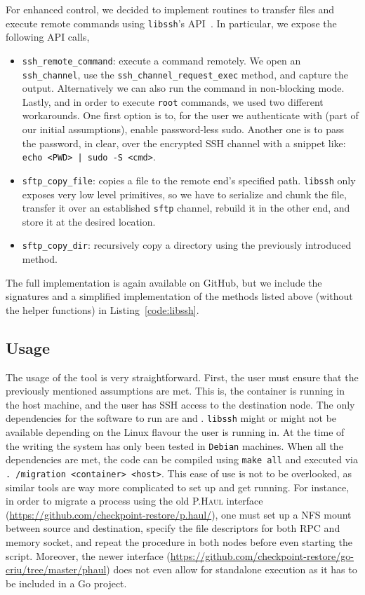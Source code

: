 For enhanced control, we decided to implement routines to transfer files and
execute remote commands using \texttt{libssh}'s API~\cite{libssh,libssh-api}.
In particular, we expose the following API calls,
\begin{itemize}
    \item
          \texttt{ssh\_remote\_command}: execute a command remotely.
          We open an \texttt{ssh\_channel}, use the \texttt{ssh\_channel\_request\_exec}
          method, and capture the output.
          Alternatively we can also run the command in non-blocking mode.
          Lastly, and in order to execute \texttt{root} commands, we used two different
          workarounds.
          One first option is to, for the user we authenticate with (part of our initial
          assumptions), enable password-less sudo.
          Another one is to pass the password, in clear, over the encrypted SSH channel
          with a snippet like: \texttt{echo <PWD> | sudo -S <cmd>}.
    \item \texttt{sftp\_copy\_file}: copies a file to the remote end's
          specified path. \texttt{libssh} only exposes very low level
          primitives, so we
          have to serialize and chunk the file, transfer it over an established
          \texttt{sftp} channel, rebuild it in the other end, and store it at
          the desired
          location.
    \item \texttt{sftp\_copy\_dir}: recursively copy a directory using the
          previously introduced method.
\end{itemize}
The full implementation is again available on GitHub, but we include the
signatures and a simplified implementation of the methods listed above (without
the helper functions) in Listing~\ref{code:libssh}.

\subsection{Usage}

The usage of the tool is very straightforward.
First, the user must ensure that the previously mentioned assumptions are met.
This is, the container is running in the host machine, and the user has SSH
access to the destination node.
The only dependencies for the software to run are \criu and \runc.
\texttt{libssh} might or might not be available depending on the Linux flavour
the user is running in.
At the time of the writing the system has only been tested in \texttt{Debian}
machines.
When all the dependencies are met, the code can be compiled using \texttt{make
    all} and executed via \texttt{.
    /migration <container> <host>}.
This ease of use is not to be overlooked, as similar tools are way more
complicated to set up and get running.
For instance, in order to migrate a process using the old \textsc{P.Haul}
interface (\url{https://github.com/checkpoint-restore/p.haul/}), one must set
up a NFS mount between source and destination, specify the file descriptors for
both RPC and memory socket, and repeat the procedure in both nodes before even
starting the script.
Moreover, the newer interface
(\url{https://github.com/checkpoint-restore/go-criu/tree/master/phaul}) does
not even allow for standalone execution as it has to be included in a Go
project.
